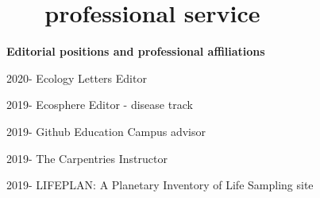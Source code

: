 \documentclass[]{CV}
\begin{document}









\section{ \faUserPlus \ \ \ professional service}

\textbf{Editorial positions and professional affiliations}

\begin{entrylist}
 
 \entry
	 {2020-}
	 {Ecology Letters}
	 {Editor}
	 
 \entry
	 {2019-}
	 {Ecosphere}
	 {Editor - disease track}

 \entry
	 {2019-}
	 {Github Education}
	 {Campus advisor}

 \entry
	 {2019-}
	 {The Carpentries}
	 {Instructor}

 \entry
	 {2019-}
	 {LIFEPLAN: A Plan­et­ary In­vent­ory of Life}
	 {Sampling site}

\end{entrylist}
\end{document}
